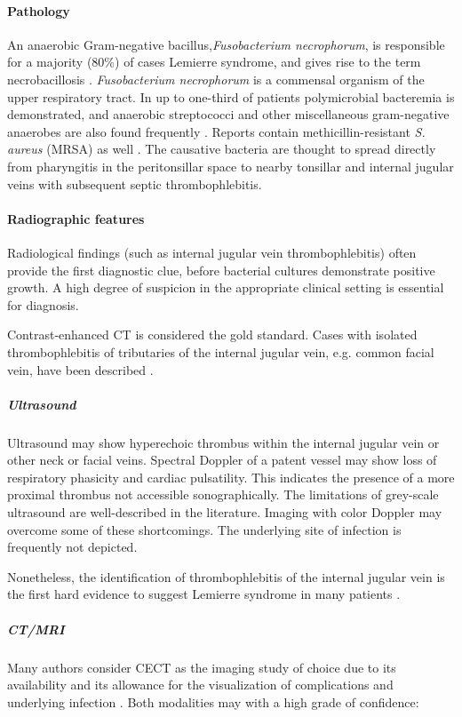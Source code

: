 \paragraph{Pathology}

An anaerobic Gram-negative bacillus,\emph{Fusobacterium necrophorum}, is responsible for a majority (80\%) of cases Lemierre syndrome, and gives rise to the term necrobacillosis . \emph{Fusobacterium necrophorum} is a commensal organism of the upper respiratory tract. In up to one-third of patients polymicrobial bacteremia is demonstrated, and anaerobic streptococci and other miscellaneous gram-negative anaerobes are also found frequently . Reports contain methicillin-resistant \emph{S. aureus} (MRSA) as well . The causative bacteria are thought to spread directly from pharyngitis in the peritonsillar space to nearby tonsillar and internal jugular veins with subsequent septic thrombophlebitis.


\paragraph{Radiographic features}

Radiological findings (such as internal jugular vein thrombophlebitis) often provide the first diagnostic clue, before bacterial cultures demonstrate positive growth. A high degree of suspicion in the appropriate clinical setting is essential for diagnosis.

Contrast-enhanced CT is considered the gold standard. Cases with isolated thrombophlebitis of tributaries of the internal jugular vein, e.g. common facial vein, have been described .


\subparagraph{Ultrasound}

Ultrasound may show hyperechoic thrombus within the internal jugular vein or other neck or facial veins. Spectral Doppler of a patent vessel may show loss of respiratory phasicity and cardiac pulsatility. This indicates the presence of a more proximal thrombus not accessible sonographically. The limitations of grey-scale ultrasound are well-described in the literature. Imaging with color Doppler may overcome some of these shortcomings. The underlying site of infection is frequently not depicted.

Nonetheless, the identification of thrombophlebitis of the internal jugular vein is the first hard evidence to suggest Lemierre syndrome in many patients .


\subparagraph{CT/MRI}

Many authors consider CECT as the imaging study of choice due to its availability and its allowance for the visualization of complications and underlying infection . Both modalities may with a high grade of confidence:

